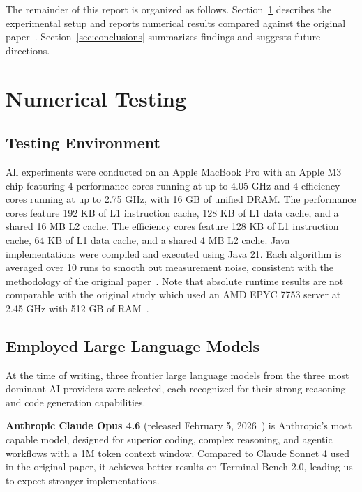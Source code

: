 The remainder of this report is organized as follows. Section~\ref{sec:testing} describes the experimental setup and reports numerical results compared against the original paper~\cite{llmgen2025}. Section~\ref{sec:conclusions} summarizes findings and suggests future directions.

\section{Numerical Testing}
\label{sec:testing}

\subsection{Testing Environment}

All experiments were conducted on an Apple MacBook Pro with an Apple M3 chip featuring 4 performance cores running at up to 4.05 GHz and 4 efficiency cores running at up to 2.75 GHz, with 16 GB of unified DRAM. The performance cores feature 192 KB of L1 instruction cache, 128 KB of L1 data cache, and a shared 16 MB L2 cache. The efficiency cores feature 128 KB of L1 instruction cache, 64 KB of L1 data cache, and a shared 4 MB L2 cache. Java implementations were compiled and executed using Java 21. Each algorithm is averaged over 10 runs to smooth out measurement noise, consistent with the methodology of the original paper~\cite{llmgen2025}. Note that absolute runtime results are not comparable with the original study which used an AMD EPYC 7753 server at 2.45 GHz with 512 GB of RAM~\cite{llmgen2025}. 

\subsection{Employed Large Language Models}

At the time of writing, three frontier large language models from the three most dominant AI providers were selected, each recognized for their strong reasoning and code generation capabilities.

\textbf{Anthropic Claude Opus 4.6} (released February 5, 2026~\cite{anthropic2026opus46}) is Anthropic's most capable model, designed for superior coding, complex reasoning, and agentic workflows with a 1M token context window. Compared to Claude Sonnet 4 used in the original paper, it achieves better results on Terminal-Bench 2.0, leading us to expect stronger implementations.

